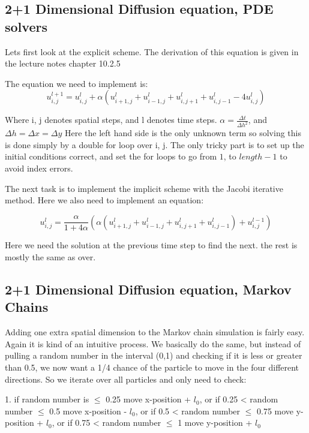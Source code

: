 \documentclass[english,a4paper,12pt]{article}
\begin{document}
\subsection*{2+1 Dimensional Diffusion equation, PDE solvers}

Lets first look at the explicit scheme. The derivation of this equation is given in the lecture notes chapter 10.2.5

The equation we need to implement is:
\begin{equation}
 u_{i,j}^{l+1} = u_{i,j}^{l} + \alpha (u_{i+1,j}^{l} +u_{i-1,j}^{l}+u_{i,j+1}^{l}+u_{i,j-1}^{l}-4 u_{i,j}^{l})
\end{equation}

Where i, j denotes spatial steps, and l denotes time steps. $\alpha = \frac{\Delta t}{\Delta h^2}$, and $\Delta h = \Delta x = \Delta y$ Here the left hand side is the only unknown term so solving
this is done simply by a double for loop over i, j. The only tricky part is to set up the initial conditions correct, and
set the for loops to go from $1$, to $length-1$ to avoid index errors.

The next task is to implement the implicit scheme with the Jacobi iterative method. Here we also need to implement an equation:

\begin{equation}
 u_{i,j}^{l} = \frac{\alpha}{1+4\alpha}(\alpha(u_{i+1,j}^{l} +u_{i-1,j}^{l}+u_{i,j+1}^{l}+u_{i,j-1}^{l}) + u_{i,j}^{l-1})
\end{equation}

Here we need the solution at the previous time step to find the next. the rest is mostly the same as over.



\subsection*{2+1 Dimensional Diffusion equation,  Markov Chains}

Adding one extra spatial dimension to the Markov chain simulation is fairly easy. Again it is kind of an intuitive process.
We basically do the same, but instead of pulling a random number in the interval (0,1) and checking if it is less or greater than
0.5, we now want a 1/4 chance of the particle to move in the four different directions. So we iterate over all particles and only need to check:

1. if random number is $\leq$ 0.25 move x-position + $l_0$, or if 0.25 < random number $\leq$ 0.5 move x-position - $l_0$, 
or if 0.5 < random number $\leq$ 0.75 move y-position + $l_0$, or if 0.75 < random number $\leq$ 1 move y-position + $l_0$
\end{document}
